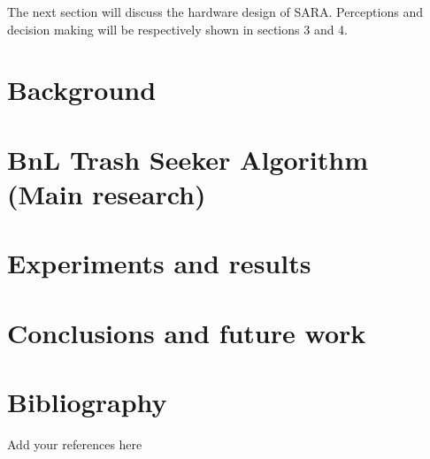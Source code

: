 \documentclass[runningheads,a4paper]{llncs}
\begin{document}
The next section will discuss the hardware design of SARA. Perceptions and decision making will be respectively shown in sections 3 and 4.


\section{Background}
\lipsum[1-3]

\section{BnL Trash Seeker Algorithm (Main research)}
\lipsum[4-14]

\section{Experiments and results}
\lipsum[15-20]

\section{Conclusions and future work}
\lipsum[21-24]

\section*{Bibliography}
Add your references here
%
%

\newpage

\end{document}
